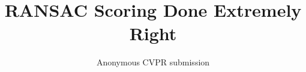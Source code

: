 \documentclass[10pt,twocolumn,letterpaper]{article}
\title{RANSAC Scoring Done Extremely Right}
\author{Anonymous CVPR submission}
\begin{document}
\maketitle





{
    \small
    
    
}
\end{document}
